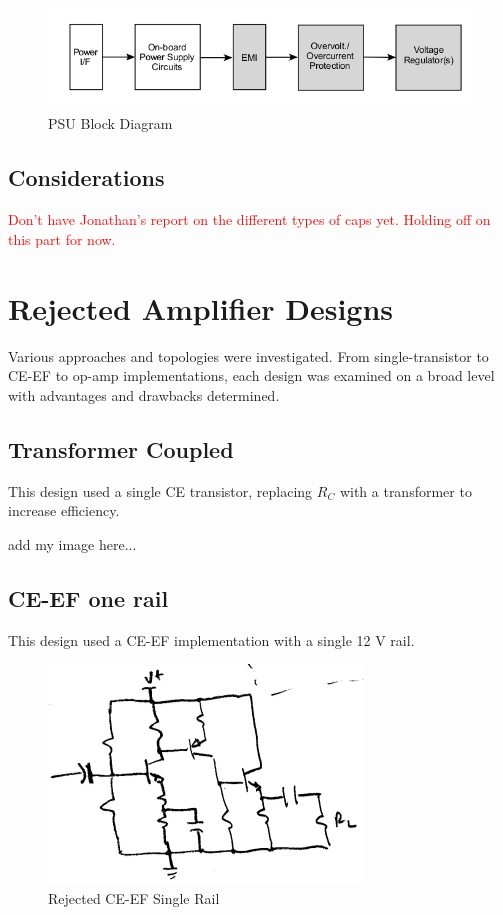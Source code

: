 \documentclass[journal]{IEEEtran}
\begin{document}
\begin{figure}[H]
\centering
\includegraphics[scale=.35]{psu-block.png}
\caption{PSU Block Diagram}
\label{fig_psu_block}
\end{figure}

\subsection{Considerations}

\textcolor{red}{Don't have Jonathan's report on the different types of caps yet. Holding off on this part for now.}

\section{Rejected Amplifier Designs}

Various approaches and topologies were investigated. From single-transistor to CE-EF to op-amp implementations, each design was examined on a broad level with advantages and drawbacks determined.

\subsection{Transformer Coupled}

This design used a single CE transistor, replacing $R_{C}$ with a transformer to increase efficiency.

add my image here...

\subsection{CE-EF one rail}

This design used a CE-EF implementation with a single 12 V rail.
\begin{figure}[H]
\centering
\includegraphics[scale=.4]{reject-2.png}
\caption{Rejected CE-EF Single Rail}
\label{fig_reject_2}
\end{figure}
\end{document}
